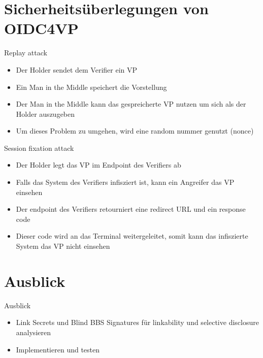 \documentclass[
	german,%
	authorontitle=true,
	]{bfhbeamer}
\begin{document}
\section{Sicherheitsüberlegungen von OIDC4VP}

\begin{frame}{Replay attack}
    \begin{itemize}
        \item Der Holder sendet dem Verifier ein VP
        \item Ein Man in the Middle speichert die Vorstellung
        \item Der Man in the Middle kann das gespreicherte VP nutzen um sich als der Holder auszugeben
        \item Um dieses Problem zu umgehen, wird eine random nummer genutzt (nonce)
    \end{itemize}
\end{frame}

\begin{frame}{Session fixation attack}
    \begin{itemize}
        \item Der Holder legt das VP im Endpoint des Verifiers ab
        \item Falls das System des Verifiers infisziert ist, kann ein Angreifer das VP einsehen
        \item Der endpoint des Verifiers retourniert eine redirect URL und ein response code
        \item Dieser code wird an das Terminal weitergeleitet, somit kann das infiszierte System das VP nicht einsehen
    \end{itemize}
\end{frame}

\section{Ausblick}

\begin{frame}{Ausblick}
    \begin{itemize}
        \item Link Secrets und Blind BBS Signatures für linkability und selective disclosure analysieren
        \item Implementieren und testen
    \end{itemize}
\end{frame}
\end{document}
